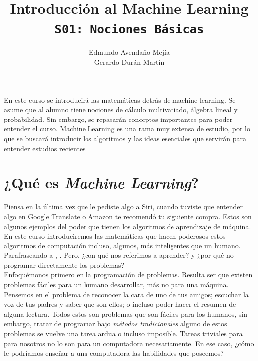 \documentclass[11pt]{article}
\title{Introducción al Machine Learning \\ \large \texttt{S01: Nociones Básicas}}
\author{Edmundo Avendaño Mejía\\Gerardo Durán Martín}
\begin{document}
\maketitle

\newcommand{\Rnums}{\mathbb{R}}

En este curso se introducirá las matemáticas detrás de machine learning. Se asume que al alumno tiene nociones de cálculo multivariado, álgebra lineal y probabilidad. Sin embargo, se repasarán conceptos importantes para poder entender el curso. Machine Learning es una rama muy extensa de estudio, por lo que se buscará introducir los algoritmos y las ideas esenciales que servirán para entender estudios recientes 

\section{¿Qué es \textit{Machine Learning}?}

Piensa en la última vez que le pediste algo a Siri, cuando tuviste que entender algo en Google Translate o Amazon te recomendó tu siguiente compra. Estos son algunos ejemplos del poder que tienen los algoritmos de aprendizaje de máquina. En este curso introduciremos las matemáticas que hacen poderosos estos algoritmos de computación incluso, algunos, más inteligentes que un humano.\\

Parafraseando a \cite{samuel}, . Pero, ¿con qué nos referimos a aprender? y ¿por qué no programar directamente los problemas?\\

Enfoquémonos primero en la programación de problemas. Resulta ser que existen problemas fáciles para un humano desarrollar, más no para una máquina. Pensemos en el problema de reconocer la cara de uno de tus amigos; escuchar la voz de tus padres y saber que son ellos; o incluso poder hacer el resumen de alguna lectura. Todos estos son problemas que son fáciles para los humanos, sin embargo, tratar de programar bajo \textit{métodos tradicionales} alguno de estos problemas se vuelve una tarea ardua o incluso imposible. Tareas triviales para para nosotros no lo son para un computadora necesariamente. En ese caso, ¿cómo le podríamos enseñar a una computadora las habilidades que poseemos?\\
\end{document}
